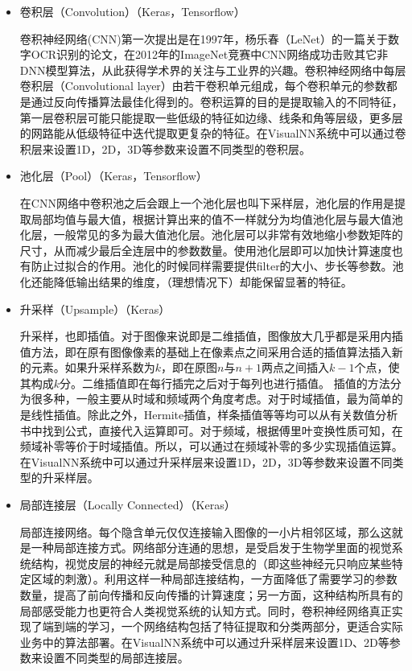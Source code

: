 \documentclass{progbookcn}
\begin{document}
\begin{itemize}
\item 卷积层（Convolution）（Keras，Tensorflow）

  ​	卷积神经网络(CNN)第一次提出是在1997年，杨乐春（LeNet）的一篇关于数字OCR识别的论文，在2012年的ImageNet竞赛中CNN网络成功击败其它非DNN模型算法，从此获得学术界的关注与工业界的兴趣。卷积神经网络中每层卷积层（Convolutional layer）由若干卷积单元组成，每个卷积单元的参数都是通过反向传播算法最佳化得到的。卷积运算的目的是提取输入的不同特征，第一层卷积层可能只能提取一些低级的特征如边缘、线条和角等层级，更多层的网路能从低级特征中迭代提取更复杂的特征。在VisualNN系统中可以通过卷积层来设置1D，2D，3D等参数来设置不同类型的卷积层。

\item 池化层（Pool）（Keras，Tensorflow）

  ​	在CNN网络中卷积池之后会跟上一个池化层也叫下采样层，池化层的作用是提取局部均值与最大值，根据计算出来的值不一样就分为均值池化层与最大值池化层，一般常见的多为最大值池化层。池化层可以非常有效地缩小参数矩阵的尺寸，从而减少最后全连层中的参数数量。使用池化层即可以加快计算速度也有防止过拟合的作用。池化的时候同样需要提供filter的大小、步长等参数。池化还能降低输出结果的维度，（理想情况下）却能保留显著的特征。

\item 升采样（Upsample）（Keras）

  ​	升采样，也即插值。对于图像来说即是二维插值，图像放大几乎都是采用内插值方法，即在原有图像像素的基础上在像素点之间采用合适的插值算法插入新的元素。如果升采样系数为$k$，即在原图$n$与$n+1$两点之间插入$k-1$个点，使其构成$k$分。二维插值即在每行插完之后对于每列也进行插值。 插值的方法分为很多种，一般主要从时域和频域两个角度考虑。对于时域插值，最为简单的是线性插值。除此之外，Hermite插值，样条插值等等均可以从有关数值分析书中找到公式，直接代入运算即可。对于频域，根据傅里叶变换性质可知，在频域补零等价于时域插值。所以，可以通过在频域补零的多少实现插值运算。在VisualNN系统中可以通过升采样层来设置1D，2D，3D等参数来设置不同类型的升采样层。

\item 局部连接层（Locally Connected）（Keras）

  ​	局部连接网络。每个隐含单元仅仅连接输入图像的一小片相邻区域，那么这就是一种局部连接方式。网络部分连通的思想，是受启发于生物学里面的视觉系统结构，视觉皮层的神经元就是局部接受信息的（即这些神经元只响应某些特定区域的刺激）。利用这样一种局部连接结构，一方面降低了需要学习的参数数量，提高了前向传播和反向传播的计算速度；另一方面，这种结构所具有的局部感受能力也更符合人类视觉系统的认知方式。同时，卷积神经网络真正实现了端到端的学习，一个网络结构包括了特征提取和分类两部分，更适合实际业务中的算法部署。在VisualNN系统中可以通过升采样层来设置1D、2D等参数来设置不同类型的局部连接层。


\end{itemize}
\end{document}
